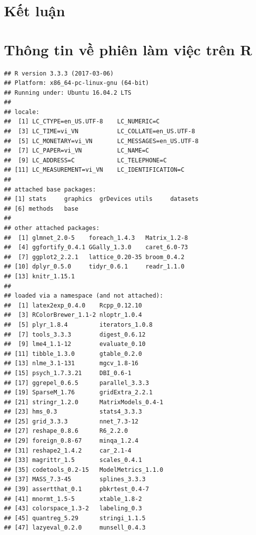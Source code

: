 \documentclass[a4paper]{report}\usepackage[]{graphicx}\usepackage[]{color}
\makeatletter
\newenvironment{kframe}{%
 \def\at@end@of@kframe{}%
 \ifinner\ifhmode%
  \def\at@end@of@kframe{\end{minipage}}%
  \begin{minipage}{\columnwidth}%
 \fi\fi%
 \def\FrameCommand##1{\hskip\@totalleftmargin \hskip-\fboxsep
 \colorbox{shadecolor}{##1}\hskip-\fboxsep
     \hskip-\linewidth \hskip-\@totalleftmargin \hskip\columnwidth}%
 \MakeFramed {\advance\hsize-\width
   \@totalleftmargin\z@ \linewidth\hsize
   \@setminipage}}%
 {\par\unskip\endMakeFramed%
 \at@end@of@kframe}
\newenvironment{knitrout}{}{} %
\makeatother
\begin{document}

\chapter{Kết luận}

\appendix

\chapter{Thông tin về phiên làm việc trên R}

\begin{knitrout}\small
{}\color{fgcolor}\begin{kframe}
\begin{verbatim}
## R version 3.3.3 (2017-03-06)
## Platform: x86_64-pc-linux-gnu (64-bit)
## Running under: Ubuntu 16.04.2 LTS
## 
## locale:
##  [1] LC_CTYPE=en_US.UTF-8    LC_NUMERIC=C           
##  [3] LC_TIME=vi_VN           LC_COLLATE=en_US.UTF-8 
##  [5] LC_MONETARY=vi_VN       LC_MESSAGES=en_US.UTF-8
##  [7] LC_PAPER=vi_VN          LC_NAME=C              
##  [9] LC_ADDRESS=C            LC_TELEPHONE=C         
## [11] LC_MEASUREMENT=vi_VN    LC_IDENTIFICATION=C    
## 
## attached base packages:
## [1] stats     graphics  grDevices utils     datasets 
## [6] methods   base     
## 
## other attached packages:
##  [1] glmnet_2.0-5    foreach_1.4.3   Matrix_1.2-8   
##  [4] ggfortify_0.4.1 GGally_1.3.0    caret_6.0-73   
##  [7] ggplot2_2.2.1   lattice_0.20-35 broom_0.4.2    
## [10] dplyr_0.5.0     tidyr_0.6.1     readr_1.1.0    
## [13] knitr_1.15.1   
## 
## loaded via a namespace (and not attached):
##  [1] latex2exp_0.4.0    Rcpp_0.12.10      
##  [3] RColorBrewer_1.1-2 nloptr_1.0.4      
##  [5] plyr_1.8.4         iterators_1.0.8   
##  [7] tools_3.3.3        digest_0.6.12     
##  [9] lme4_1.1-12        evaluate_0.10     
## [11] tibble_1.3.0       gtable_0.2.0      
## [13] nlme_3.1-131       mgcv_1.8-16       
## [15] psych_1.7.3.21     DBI_0.6-1         
## [17] ggrepel_0.6.5      parallel_3.3.3    
## [19] SparseM_1.76       gridExtra_2.2.1   
## [21] stringr_1.2.0      MatrixModels_0.4-1
## [23] hms_0.3            stats4_3.3.3      
## [25] grid_3.3.3         nnet_7.3-12       
## [27] reshape_0.8.6      R6_2.2.0          
## [29] foreign_0.8-67     minqa_1.2.4       
## [31] reshape2_1.4.2     car_2.1-4         
## [33] magrittr_1.5       scales_0.4.1      
## [35] codetools_0.2-15   ModelMetrics_1.1.0
## [37] MASS_7.3-45        splines_3.3.3     
## [39] assertthat_0.1     pbkrtest_0.4-7    
## [41] mnormt_1.5-5       xtable_1.8-2      
## [43] colorspace_1.3-2   labeling_0.3      
## [45] quantreg_5.29      stringi_1.1.5     
## [47] lazyeval_0.2.0     munsell_0.4.3
\end{verbatim}
\end{kframe}
\end{knitrout}




\printbibliography
{}
\end{document}
